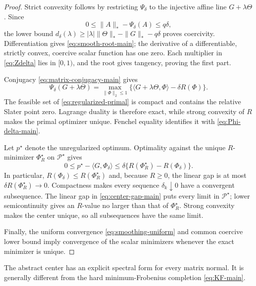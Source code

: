 \begin{proof}
Strict convexity follows by restricting \(\Psi_\delta\) to the injective
affine line \(G+\lambda\Theta\).  Since
\begin{equation}
 0\le\|A\|_*-\Psi_\delta(A)\le q\delta,
 \label{eq:smoothing-uniform}
\end{equation}
the lower bound
\(d_\delta(\lambda)\ge
 |\lambda|\|\Theta\|_*-\|G\|_*-q\delta\) proves coercivity.  Differentiation
gives \eqref{eq:smooth-root-main}; the derivative of a differentiable,
strictly convex, coercive scalar function has one zero.  Each multiplier in
\eqref{eq:Zdelta} lies in \([0,1)\), and the root gives tangency, proving
the first part.

Conjugacy \eqref{eq:matrix-conjugacy-main} gives
\[
 \Psi_\delta(G+\lambda\Theta)
 =\max_{\|\Phi\|_2\le1}
 \{\langle G+\lambda\Theta,\Phi\rangle-\delta R(\Phi)\}.
\]
The feasible set of \eqref{eq:regularized-primal} is compact and contains
the relative Slater point zero.  Lagrange duality is therefore exact, while
strong convexity of \(R\) makes the primal optimizer unique.  Fenchel equality
identifies it with \eqref{eq:Phi-delta-main}.

Let \(p^\star\) denote the unregularized optimum.  Optimality against the
unique \(R\)-minimizer \(\Phi_R^\star\) on \(\mathcal P^\star\) gives
\begin{equation}
 0\le p^\star-\langle G,\Phi_\delta\rangle
 \le\delta\{R(\Phi_R^\star)-R(\Phi_\delta)\}.
 \label{eq:center-gap-main}
\end{equation}
In particular, \(R(\Phi_\delta)\le R(\Phi_R^\star)\) and, because
\(R\ge0\), the linear gap is at most
\(\delta R(\Phi_R^\star)\to0\).
Compactness makes every sequence \(\delta_k\downarrow0\) have a convergent
subsequence.  The linear gap in \eqref{eq:center-gap-main} puts every limit in
\(\mathcal P^\star\); lower semicontinuity gives an \(R\)-value no larger than
that of \(\Phi_R^\star\).  Strong convexity makes the center unique, so all
subsequences have the same limit.

 Finally, the uniform convergence
 \eqref{eq:smoothing-uniform} and common coercive lower bound imply convergence
 of the scalar minimizers whenever the exact minimizer is unique.
\end{proof}

The abstract center has an explicit spectral form for every matrix normal.
It is generally different from the hard minimum-Frobenius completion
\eqref{eq:KF-main}.

